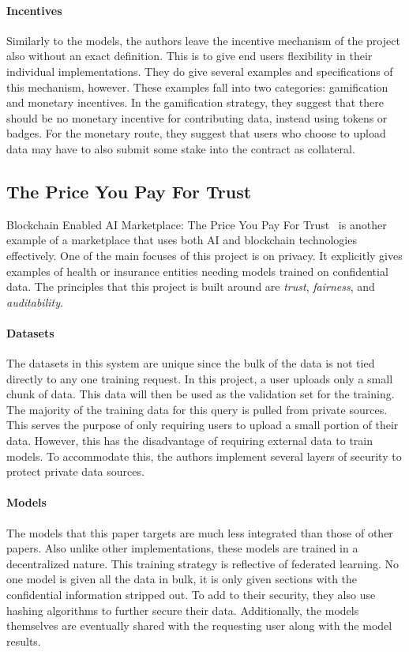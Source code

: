\documentclass{ledger}
\begin{document}
\paragraph{Incentives}
Similarly to the models, the authors leave the incentive mechanism of the project also without an exact definition.
This is to give end users flexibility in their individual implementations.  They do give several examples and
specifications of this mechanism, however.  These examples fall into two categories: gamification and monetary
incentives.  In the gamification strategy, they suggest that there should be no monetary incentive for contributing
data, instead using tokens or badges.  For the monetary route, they suggest that users who choose to upload data may have
to also submit some stake into the contract as collateral.

\subsection{The Price You Pay For Trust}

Blockchain Enabled AI Marketplace: The Price You Pay For Trust~\cite{priceOfTrust} is another example of a marketplace
that uses both AI and blockchain technologies effectively.  One of the main focuses of this project is on privacy.
It explicitly gives examples of health or insurance entities needing models trained on confidential data.  The principles
that this project is built around are \textit{trust}, \textit{fairness}, and \textit{auditability}.

\paragraph{Datasets}
The datasets in this system are unique since the bulk of the data is not tied directly to any one training request.
In this project, a user uploads only a small chunk of data.  This data will then be used as the validation set for
the training.  The majority of the training data for this query is pulled from private sources.  This serves the purpose
of only requiring users to upload a small portion of their data.  However, this has the disadvantage of requiring
external data to train models.  To accommodate this, the authors implement several layers of security to protect private
data sources.

\paragraph{Models}
The models that this paper targets are much less integrated than those of other papers.  Also unlike other implementations,
these models are trained in a decentralized nature.  This training strategy is reflective of federated learning.  No
one model is given all the data in bulk, it is only given sections with the confidential information stripped out.
To add to their security, they also use hashing algorithms to further secure their data.  Additionally, the models
themselves are eventually shared with the requesting user along with the model results.
\end{document}
